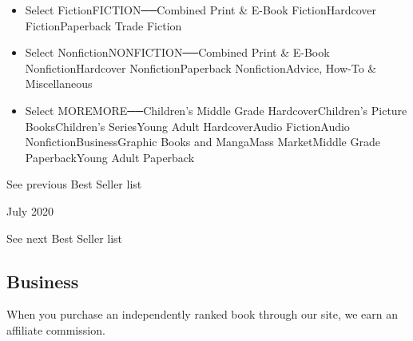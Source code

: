 \begin{itemize}
\tightlist
\item
  Select FictionFICTION──Combined Print \& E-Book FictionHardcover
  FictionPaperback Trade Fiction
\item
  Select NonfictionNONFICTION──Combined Print \& E-Book
  NonfictionHardcover NonfictionPaperback NonfictionAdvice, How-To \&
  Miscellaneous
\item
  Select MOREMORE──Children's Middle Grade HardcoverChildren's Picture
  BooksChildren's SeriesYoung Adult HardcoverAudio FictionAudio
  NonfictionBusinessGraphic Books and MangaMass MarketMiddle Grade
  PaperbackYoung Adult Paperback
\end{itemize}

\href{/books/best-sellers/2020/06/01/business-books/}{}

See previous Best Seller list

July 2020

See next Best Seller list

\hypertarget{business}{%
\subsection{Business}\label{business}}

When you purchase an independently ranked book through our site, we earn
an affiliate commission.

